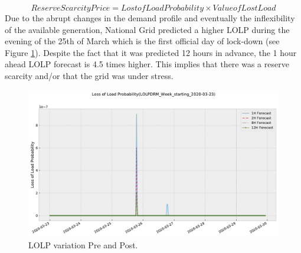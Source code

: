 \documentclass[energies,article,submit,moreauthors,pdftex]{Definitions/mdpi}
\begin{document}
\begin{equation}\label{eq:reservescarc}
Reserve Scarcity Price = Lost of Load Probability \times Value of Lost Load
\end{equation}
Due to the abrupt changes in the demand profile and eventually the inflexibility of the available generation, National Grid predicted a higher LOLP during the evening of the 25th of March which is the first official day of lock-down (see Figure \ref{fig:LOLP_25_03}). Despite the fact that it was predicted 12 hours in advance, the 1 hour ahead LOLP forecast is 4.5 times higher. This implies that there was a reserve scarcity and/or that the grid was under stress.

\begin{figure}[H]\centering
\hspace{-25pt}\includegraphics[width=15 cm]{Graphics/LOLPDRM_Week_starting_2020-03-23no4H.pdf}
\caption{LOLP variation Pre and Post.}\label{fig:LOLP_25_03}
\end{figure}  

\end{document}
